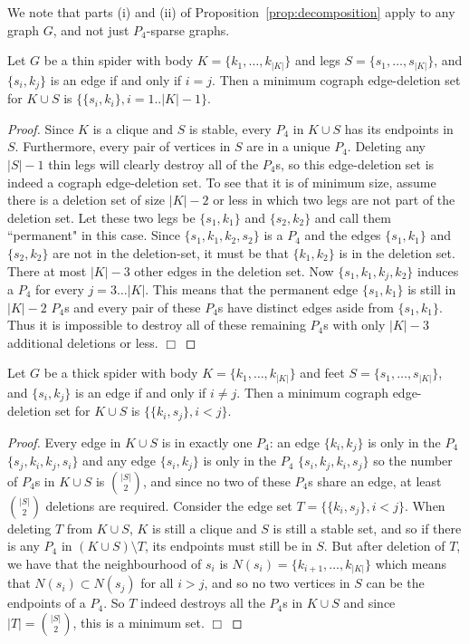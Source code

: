 \documentclass{llncs}
\begin{document}
We note that parts (i) and (ii) of Proposition~\ref{prop:decomposition} apply to any graph $G$, and not just $P_4$-sparse graphs.

\begin{lemma} \label{thin}
  Let $G$ be a thin spider with body $K = \{k_1, \ldots , k_{|K|}\}$ and legs $S = \{s_1,\ldots ,s_{|K|}\}$, and $\{s_i, k_j\}$ is an edge if and only if $i=j$. Then a minimum cograph edge-deletion set for $K \cup S$ is $\{ \{s_i, k_i\}, i=1..|K|-1\}$.
\end{lemma}

\begin{proof}
  Since $K$ is a clique and $S$ is stable, every $P_4$ in $K \cup S$ has its endpoints in $S$. Furthermore, every pair of vertices in $S$ are in a unique $P_4$. Deleting any $|S|-1$ thin legs will clearly destroy all of the $P_4$s, so this edge-deletion set is indeed a cograph edge-deletion set. To see that it is of minimum size, assume there is a deletion set of size $|K|-2$ or less in which two legs are not part of the deletion set. Let these two legs be $\{s_1,k_1\}$ and $\{s_2,k_2\}$ and call them ``permanent" in this case. Since $\{s_1, k_1, k_2, s_2\}$ is a $P_4$ and the edges $\{s_1,k_1\}$ and $\{s_2,k_2\}$ are not in the deletion-set, it must be that $\{k_1, k_2\}$ is in the deletion set. There at most $|K|-3$ other edges in the deletion set. Now $\{s_1, k_1, k_j, k_2\}$ induces a $P_4$ for every $j=3\ldots |K|$. This means that the permanent edge $\{s_1,k_1\}$ is still in $|K|-2$ $P_4$s and every pair of these $P_4$s have distinct edges aside from $\{s_1,k_1\}$. Thus it is impossible to destroy all of these remaining $P_4$s with only $|K|-3$ additional deletions or less.
  \hfill $\Box$
\end{proof}

\begin{lemma} \label{thick}
  Let $G$ be a thick spider with body $K = \{k_1, \ldots , k_{|K|}\}$ and feet $S = \{s_1,\ldots ,s_{|K|}\}$, and $\{s_i, k_j\}$ is an edge if and only if $i\neq  j$. Then a minimum cograph edge-deletion set for $K \cup S$ is $\{ \{k_i, s_j\}, i<j \}$.
\end{lemma}

\begin{proof}
 Every edge in $K \cup S$ is in exactly one $P_4$: an edge $\{k_i,k_j\}$ is only in the $P_4$ $\{s_j, k_i, k_j, s_i\}$ and any edge $\{s_i, k_j\}$ is only in the $P_4$ $\{s_i, k_j, k_i, s_j\}$ so the number of $P_4$s in $K \cup S$ is $\binom{|S|}{2}$, and since no two of these $P_4$s share an edge, at least $\binom{|S|}{2}$ deletions are required. Consider the edge set $T = \{ \{k_i,s_j\}, i<j\}$. When deleting $T$ from $K \cup S$, $K$ is still a clique and $S$ is still a stable set, and so if there is any $P_4$ in $(K \cup S) \setminus T$, its endpoints must still be in $S$. But after deletion of $T$, we have that the neighbourhood of $s_i$ is $N(s_i) = \{k_{i+1}, \ldots ,k_{|K|}\}$ which means that $N(s_i) \subset N(s_j)$ for all $i>j$, and so no two vertices in $S$ can be the endpoints of a $P_4$. So $T$ indeed destroys all the $P_4$s in $K \cup S$ and since $|T| = \binom{|S|}{2}$, this is a minimum set.
\hfill $\Box$
\end{proof}
\end{document}
